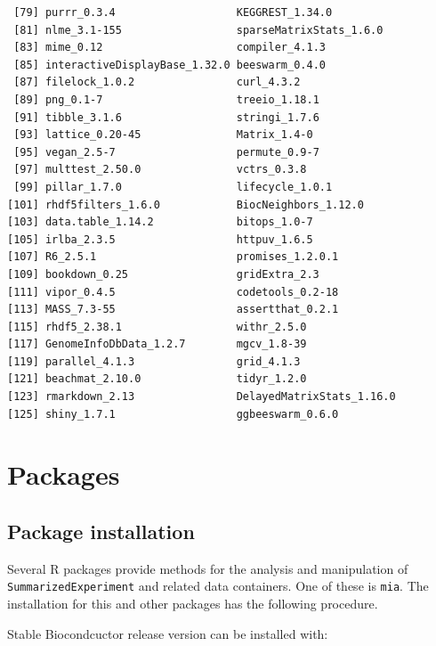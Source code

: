 \documentclass[
]{book}
\begin{document}
\begin{verbatim}
 [79] purrr_0.3.4                   KEGGREST_1.34.0              
 [81] nlme_3.1-155                  sparseMatrixStats_1.6.0      
 [83] mime_0.12                     compiler_4.1.3               
 [85] interactiveDisplayBase_1.32.0 beeswarm_0.4.0               
 [87] filelock_1.0.2                curl_4.3.2                   
 [89] png_0.1-7                     treeio_1.18.1                
 [91] tibble_3.1.6                  stringi_1.7.6                
 [93] lattice_0.20-45               Matrix_1.4-0                 
 [95] vegan_2.5-7                   permute_0.9-7                
 [97] multtest_2.50.0               vctrs_0.3.8                  
 [99] pillar_1.7.0                  lifecycle_1.0.1              
[101] rhdf5filters_1.6.0            BiocNeighbors_1.12.0         
[103] data.table_1.14.2             bitops_1.0-7                 
[105] irlba_2.3.5                   httpuv_1.6.5                 
[107] R6_2.5.1                      promises_1.2.0.1             
[109] bookdown_0.25                 gridExtra_2.3                
[111] vipor_0.4.5                   codetools_0.2-18             
[113] MASS_7.3-55                   assertthat_0.2.1             
[115] rhdf5_2.38.1                  withr_2.5.0                  
[117] GenomeInfoDbData_1.2.7        mgcv_1.8-39                  
[119] parallel_4.1.3                grid_4.1.3                   
[121] beachmat_2.10.0               tidyr_1.2.0                  
[123] rmarkdown_2.13                DelayedMatrixStats_1.16.0    
[125] shiny_1.7.1                   ggbeeswarm_0.6.0             
\end{verbatim}

\hypertarget{packages}{%
\chapter{Packages}\label{packages}}

\hypertarget{package-installation}{%
\section{Package installation}\label{package-installation}}

Several R packages provide methods for the analysis and manipulation
of \texttt{SummarizedExperiment} and related data containers. One of these is
\texttt{mia}. The installation for this and other packages has the following
procedure.

Stable Biocondcuctor release version can be installed with:
\end{document}
